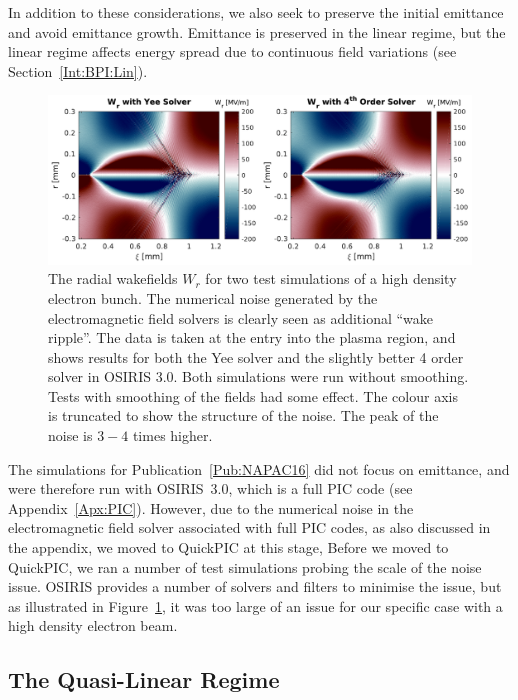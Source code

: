 In addition to these considerations, we also seek to preserve the initial emittance and avoid emittance growth.
Emittance is preserved in the linear regime, but the linear regime affects energy spread due to continuous field variations (see Section~\ref{Int:BPI:Lin}).

\begin{figure}[hbt]
    \centering
    \includegraphics[width=0.999\linewidth]{figures/EMFSolverNoise}
    \caption{\label{Fig:SimA:EMFNoise}
        The radial wakefields $W_r$ for two test simulations of a high density electron bunch.
        The numerical noise generated by the electromagnetic field solvers is clearly seen as additional ``wake ripple''.
        The data is taken at the entry into the plasma region, and shows results for both the Yee solver and the slightly better 4 order solver in OSIRIS 3.0.
        Both simulations were run without smoothing.
        Tests with smoothing of the fields had some effect.
        The colour axis is truncated to show the structure of the noise.
        The peak of the noise is $3-4$ times higher.
    }
\end{figure}

The simulations for Publication~\ref{Pub:NAPAC16} did not focus on emittance, and were therefore run with OSIRIS~3.0, which is a full PIC code (see Appendix~\ref{Apx:PIC}).
However, due to the numerical noise in the electromagnetic field solver associated with full PIC codes, as also discussed in the appendix, we moved to QuickPIC at this stage,
Before we moved to QuickPIC, we ran a number of test simulations probing the scale of the noise issue.
OSIRIS provides a number of solvers and filters to minimise the issue, but as illustrated in Figure~\ref{Fig:SimA:EMFNoise}, it was too large of an issue for our specific case with a high density electron beam.

\subsection{The Quasi-Linear Regime}
\label{SimA:QLin}

